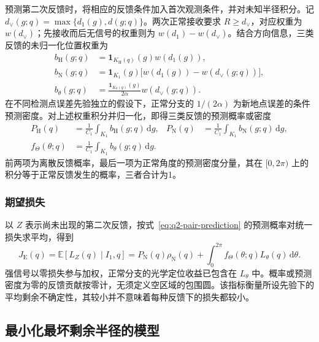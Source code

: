 \documentclass[UTF8,a4paper,zihao=-4,fontset=none]{ctexart}
\begin{document}
预测第二次反馈时，将相应的反馈条件加入首次观测条件，并对未知半径积分。记 \(d_\vee(g;q)=\max\{d_1(g),d(g;q)\}\)。两次正常接收要求 \(R\ge d_\vee\)，对应权重为 \(w(d_\vee)\)；先接收而后无信号的权重则为 \(w(d_1)-w(d_\vee)\)。结合方向信息，三类反馈的未归一化位置权重为
\begin{equation}
\begin{aligned}
 b_{\mathrm H}(g;q)&=\mathbf1_{K_{\mathrm H}(q)}(g)w(d_1(g)),\\
 b_{\mathrm N}(g;q)&=\mathbf1_{K_1}(g)\bigl[w(d_1(g))-w(d_\vee(g;q))\bigr],\\
 b_\theta(g;q)&=\frac{\mathbf1_{K_\theta(q)}(g)}{2\alpha}w(d_\vee(g;q)).
\end{aligned}
\label{eq:q2-pair-feedback-weights}
\end{equation}
在不同检测点误差先验独立的假设下，正常分支的 \(1/(2\alpha)\) 为新地点误差的条件预测密度。对上述权重积分并归一化，即得三类反馈的预测概率或密度
\begin{equation}
\begin{aligned}
 P_{\mathrm H}(q)&=\frac{1}{C_1}\int_{K_1}b_{\mathrm H}(g;q)\,\mathrm dg,
 &P_{\mathrm N}(q)&=\frac{1}{C_1}\int_{K_1}b_{\mathrm N}(g;q)\,\mathrm dg,\\
 f_\Theta(\theta;q)&=\frac{1}{C_1}\int_{K_1}b_\theta(g;q)\,\mathrm dg.
\end{aligned}
\label{eq:q2-pair-prediction}
\end{equation}
前两项为离散反馈概率，最后一项为正常角度的预测密度分量，其在 \([0,2\pi)\) 上的积分等于正常反馈发生的概率，三者合计为1。

\subsubsection{期望损失}

以 \(Z\) 表示尚未出现的第二次反馈，按式~\eqref{eq:q2-pair-prediction} 的预测概率对统一损失求平均，得到
\begin{equation}
 J_{\mathrm E}(q)=\mathbb E[L_Z(q)\mid I_1,q]
 =P_{\mathrm N}(q)\rho_{\mathrm N}(q)
 +\int_0^{2\pi}f_\Theta(\theta;q)L_\theta(q)\,\mathrm d\theta.
\label{eq:q2-pair-expected-objective}
\end{equation}
强信号以零损失参与加权，正常分支的光学定位收益已包含在 \(L_\theta\) 中。概率或预测密度为零的反馈贡献按零计，无须定义空区域的包围圆。该指标衡量所设先验下的平均剩余不确定性，其较小并不意味着每种反馈下的损失都较小。

\subsection{最小化最坏剩余半径的模型}
\end{document}
